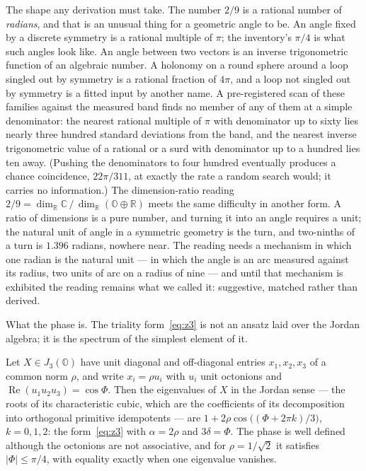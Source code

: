 The shape any derivation must take. The number $2/9$ is a rational number of \emph{radians}, and
that is an unusual thing for a geometric angle to be. An angle fixed by a discrete symmetry is a
rational multiple of $\pi$; the inventory's $\pi/4$ is what such angles look like. An angle
between two vectors is an inverse trigonometric function of an algebraic number. A holonomy on a
round sphere around a loop singled out by symmetry is a rational fraction of $4\pi$, and a loop
not singled out by symmetry is a fitted input by another name. A pre-registered scan of these
families against the measured band finds no member of any of them at a simple denominator: the
nearest rational multiple of $\pi$ with denominator up to sixty lies nearly three hundred
standard deviations from the band, and the nearest inverse trigonometric value of a rational or
a surd with denominator up to a hundred lies ten away. (Pushing the denominators to four hundred
eventually produces a chance coincidence, $22\pi/311$, at exactly the rate a random search
would; it carries no information.) The dimension-ratio reading $2/9 =
\dim_{\mathbb{R}}\mathbb{C} \,/\, \dim_{\mathbb{R}}(\mathbb{O}\oplus\mathbb{R})$ meets the same
difficulty in another form. A ratio of dimensions is a pure number, and turning it into an angle
requires a unit; the natural unit of angle in a symmetric geometry is the turn, and two-ninths
of a turn is $1.396$ radians, nowhere near. The reading needs a mechanism in which one radian is
the natural unit --- in which the angle is an arc measured against its radius, two units of arc
on a radius of nine --- and until that mechanism is exhibited the reading remains what we called
it: suggestive, matched rather than derived.

What the phase is. The triality form~\eqref{eq:z3} is not an ansatz laid over the Jordan
algebra; it is the spectrum of the simplest element of it.

\begin{proposition}\label{prop:koide-jordan}
Let $X \in J_3(\mathbb{O})$ have unit diagonal and off-diagonal entries $x_1, x_2, x_3$ of a
common norm $\rho$, and write $x_i = \rho u_i$ with $u_i$ unit octonions and
$\operatorname{Re}(u_1u_2u_3) = \cos\Phi$. Then the eigenvalues of $X$ in the Jordan sense ---
the roots of its characteristic cubic, which are the coefficients of its decomposition into
orthogonal primitive idempotents
\autocite{springerOctonionsJordanAlgebras2000,drayExceptionalJordanEigenvalue1999} --- are $1 +
2\rho\cos\bigl((\Phi + 2\pi k)/3\bigr)$, $k = 0, 1, 2$: the form~\eqref{eq:z3} with $\alpha =
2\rho$ and $3\delta = \Phi$. The phase is well defined although the octonions are not
associative, and for $\rho = 1/\sqrt2$ it satisfies $|\Phi| \le \pi/4$, with equality exactly
when one eigenvalue vanishes.
\end{proposition}

